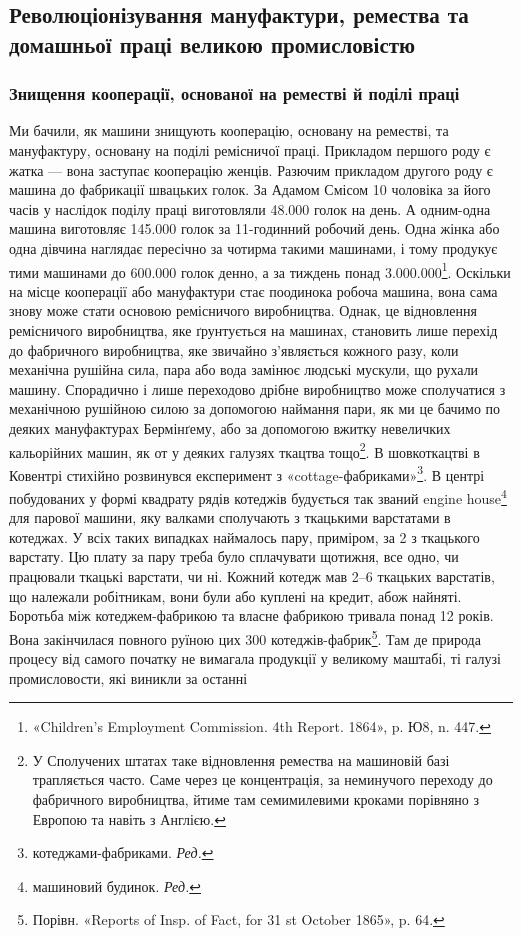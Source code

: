 
\subsection{Революціонізування мануфактури, ремества та домашньої
праці великою промисловістю}

\subsubsection{Знищення кооперації, основаної
на реместві й поділі праці}

Ми бачили, як машини знищують кооперацію, основану на
реместві, та мануфактуру, основану на поділі ремісничої
праці. Прикладом першого роду є жатка — вона заступає кооперацію
женців. Разючим прикладом другого роду є машина до
фабрикації швацьких голок. За Адамом Смісом 10 чоловіка за
його часів у наслідок поділу праці виготовляли \num{48.000} голок на
день. А одним-одна машина виготовляє \num{145.000} голок за 11-годинний
робочий день. Одна жінка або одна дівчина наглядає
пересічно за чотирма такими машинами, і тому продукує тими
машинами до \num{600.000} голок денно, а за тиждень понад \num{3.000.000}\footnote{
«Children’s Employment Commission. 4th Report. 1864», p. Ю8,
n. 447.
}.
Оскільки на місце кооперації або мануфактури стає поодинока
робоча машина, вона сама знову може стати основою ремісничого
виробництва. Однак, це відновлення ремісничого виробництва,
яке ґрунтується на машинах, становить лише перехід до фабричного
виробництва, яке звичайно з’являється кожного разу, коли
механічна рушійна сила, пара або вода замінює людські мускули,
що рухали машину. Спорадично і лише переходово дрібне виробництво
може сполучатися з механічною рушійною силою за
допомогою наймання пари, як ми це бачимо по деяких мануфактурах
Бермінґему, або за допомогою вжитку невеличких кальорійних
машин, як от у деяких галузях ткацтва тощо\footnote{
У Сполучених штатах таке відновлення ремества на машиновій
базі трапляється часто. Саме через це концентрація, за неминучого переходу
до фабричного виробництва, йтиме там семимилевими кроками порівняно
з Европою та навіть з Англією.
}. В шовкоткацтві в Ковентрі стихійно розвинувся експеримент з
«cottage-фабриками»\footnote*{
котеджами-фабриками. \emph{Ред.}
}.
В центрі побудованих у формі квадрату рядів котеджів
будується так званий engine house\footnote*{
машиновий будинок. \emph{Ред.}
} для парової машини, яку валками сполучають з ткацькими варстатами в котеджах.
У всіх таких випадках наймалось пару, приміром, за 2
з ткацького варстату. Цю плату за пару треба було сплачувати
щотижня, все одно, чи працювали ткацькі варстати, чи ні. Кожний
котедж мав 2--6 ткацьких варстатів, що належали робітникам,
вони були або куплені на кредит, абож найняті. Боротьба між
котеджем-фабрикою та власне фабрикою тривала понад 12 років.
Вона закінчилася повного руїною цих 300 котеджів-фабрик\footnote{
Порівн. «Reports of Insp. of Fact, for 31 st October 1865», p. 64.
}. Там де природа процесу від самого початку не вимагала продукції у великому
маштабі, ті галузі промисловости, які виникли за останні
\parbreak{}  %
